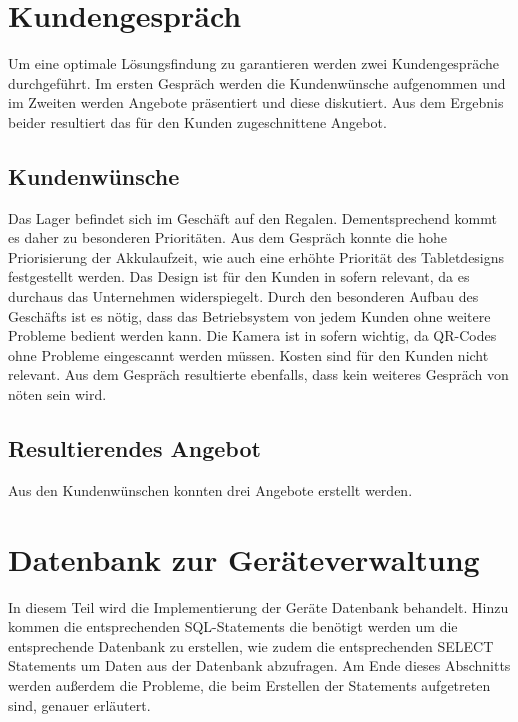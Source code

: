 \documentclass{article}
\begin{document}
\section{Kundengespräch}
Um eine optimale Lösungsfindung zu garantieren werden zwei Kundengespräche durchgeführt. Im ersten Gespräch werden die Kundenwünsche aufgenommen und im Zweiten werden Angebote präsentiert und diese diskutiert. Aus dem Ergebnis beider resultiert das für den Kunden zugeschnittene Angebot. 
\subsection{Kundenwünsche}
Das Lager befindet sich im Geschäft auf den Regalen. Dementsprechend kommt es daher zu besonderen Prioritäten.\newline
Aus dem Gespräch konnte die hohe Priorisierung der Akkulaufzeit, wie auch eine erhöhte Priorität des Tabletdesigns festgestellt werden. Das Design ist für den Kunden in sofern relevant, da es durchaus das Unternehmen widerspiegelt. Durch den besonderen Aufbau des Geschäfts ist es nötig, dass das Betriebsystem  von jedem Kunden ohne weitere Probleme bedient werden kann. Die Kamera ist in sofern wichtig, da QR-Codes ohne Probleme eingescannt werden müssen. Kosten sind für den Kunden nicht relevant.
Aus dem Gespräch resultierte ebenfalls, dass kein weiteres Gespräch von nöten sein wird.
\subsection{Resultierendes Angebot}
Aus den Kundenwünschen konnten drei Angebote erstellt werden.

\section{Datenbank zur Geräteverwaltung}

In diesem Teil wird die Implementierung der Geräte Datenbank behandelt. Hinzu kommen die entsprechenden SQL-Statements die benötigt werden um die entsprechende Datenbank zu erstellen, wie zudem die entsprechenden SELECT Statements um Daten aus der Datenbank abzufragen. Am Ende dieses Abschnitts werden außerdem die Probleme, die beim Erstellen der Statements aufgetreten sind, genauer erläutert.
\newpage
\end{document}

